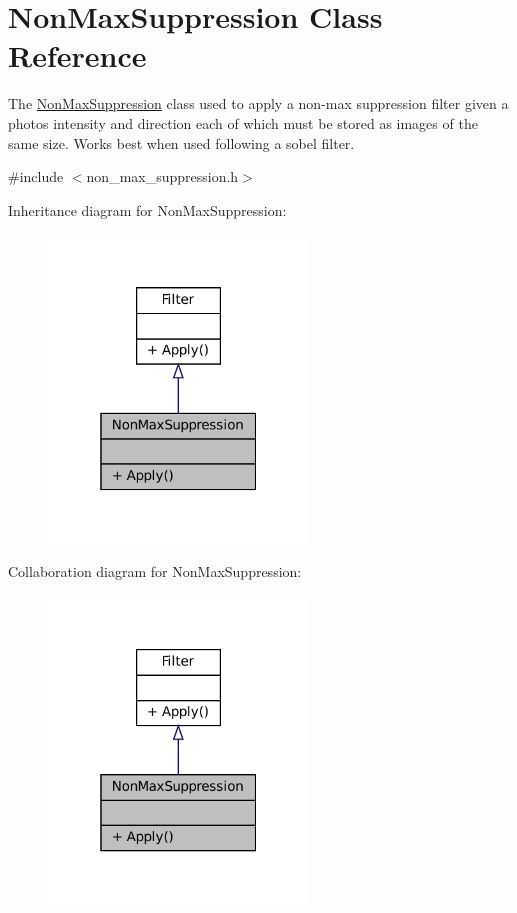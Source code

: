 \hypertarget{classNonMaxSuppression}{}\section{Non\+Max\+Suppression Class Reference}
\label{classNonMaxSuppression}


The \hyperlink{classNonMaxSuppression}{Non\+Max\+Suppression} class used to apply a non-\/max suppression filter given a photo\textquotesingle{}s intensity and direction each of which must be stored as images of the same size. Works best when used following a sobel filter.  




{\ttfamily \#include $<$non\+\_\+max\+\_\+suppression.\+h$>$}



Inheritance diagram for Non\+Max\+Suppression\+:
\nopagebreak
\begin{figure}[H]
\begin{center}
\leavevmode
\includegraphics[width=196pt]{classNonMaxSuppression__inherit__graph}
\end{center}
\end{figure}


Collaboration diagram for Non\+Max\+Suppression\+:
\nopagebreak
\begin{figure}[H]
\begin{center}
\leavevmode
\includegraphics[width=196pt]{classNonMaxSuppression__coll__graph}
\end{center}
\end{figure}
